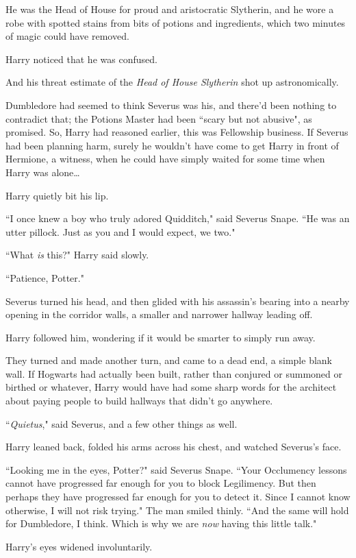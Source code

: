 He was the Head of House for proud and aristocratic Slytherin, and he wore a robe with spotted stains from bits of potions and ingredients, which two minutes of magic could have removed.

Harry noticed that he was confused.

And his threat estimate of the \emph{Head of House Slytherin} shot up astronomically.

Dumbledore had seemed to think Severus was his, and there'd been nothing to contradict that; the Potions Master had been ``scary but not abusive", as promised. So, Harry had reasoned earlier, this was Fellowship business. If Severus had been planning harm, surely he wouldn't have come to get Harry in front of Hermione, a witness, when he could have simply waited for some time when Harry was alone{\ldots}

Harry quietly bit his lip.

``I once knew a boy who truly adored Quidditch," said Severus Snape. ``He was an utter pillock. Just as you and I would expect, we two."

``What \emph{is} this?" Harry said slowly.

``Patience, Potter."

Severus turned his head, and then glided with his assassin's bearing into a nearby opening in the corridor walls, a smaller and narrower hallway leading off.

Harry followed him, wondering if it would be smarter to simply run away.

They turned and made another turn, and came to a dead end, a simple blank wall. If Hogwarts had actually been built, rather than conjured or summoned or birthed or whatever, Harry would have had some sharp words for the architect about paying people to build hallways that didn't go anywhere.

``\emph{Quietus}," said Severus, and a few other things as well.

Harry leaned back, folded his arms across his chest, and watched Severus's face.

``Looking me in the eyes, Potter?" said Severus Snape. ``Your Occlumency lessons cannot have progressed far enough for you to block Legilimency. But then perhaps they have progressed far enough for you to detect it. Since I cannot know otherwise, I will not risk trying." The man smiled thinly. ``And the same will hold for Dumbledore, I think. Which is why we are \emph{now} having this little talk."

Harry's eyes widened involuntarily.

